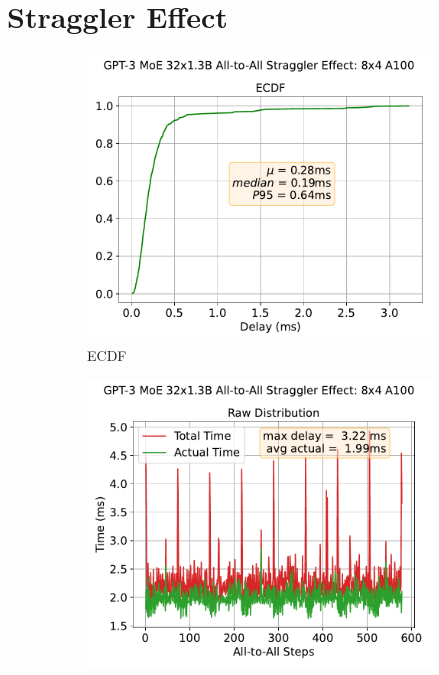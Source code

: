 \section{Straggler Effect}\label{subsec:straggler-effect}
\begin{figure}[!ht]
    \centering
     \begin{subfigure}{0.49\textwidth}
        \centering
        \includegraphics[width=\linewidth, keepaspectratio]{figures/GPT-3_MoE_32x1.3B_ecdf}
        \caption{ECDF}
        \label{sub:ecdf_perl}
    \end{subfigure}
    \begin{subfigure}{0.49\textwidth}
        \centering
        \includegraphics[width=\linewidth, keepaspectratio]{figures/GPT-3_MoE_32x1.3B}

\end{subfigure}
\end{figure}
